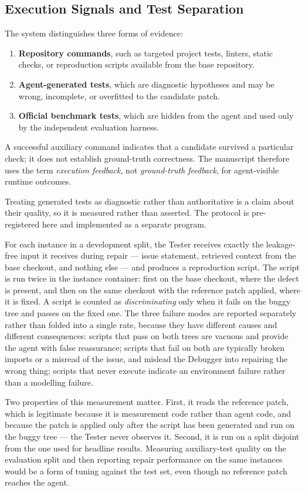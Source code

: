 \documentclass[journal]{IEEEtran}
\begin{document}
\subsection{Execution Signals and Test Separation}

The system distinguishes three forms of evidence:
\begin{enumerate}
    \item \textbf{Repository commands}, such as targeted project tests, linters, static checks, or reproduction scripts available from the base repository.
    \item \textbf{Agent-generated tests}, which are diagnostic hypotheses and may be wrong, incomplete, or overfitted to the candidate patch.
    \item \textbf{Official benchmark tests}, which are hidden from the agent and used only by the independent evaluation harness.
\end{enumerate}
A successful auxiliary command indicates that a candidate survived a particular check; it does not establish ground-truth correctness. The manuscript therefore uses the term \emph{execution feedback}, not \emph{ground-truth feedback}, for agent-visible runtime outcomes.

Treating generated tests as diagnostic rather than authoritative is a claim about their quality, so it is measured rather than asserted. The protocol is pre-registered here and implemented as a separate program.

For each instance in a development split, the Tester receives exactly the leakage-free input it receives during repair --- issue statement, retrieved context from the base checkout, and nothing else --- and produces a reproduction script. The script is run twice in the instance container: first on the base checkout, where the defect is present, and then on the same checkout with the reference patch applied, where it is fixed. A script is counted as \emph{discriminating} only when it fails on the buggy tree and passes on the fixed one. The three failure modes are reported separately rather than folded into a single rate, because they have different causes and different consequences: scripts that pass on both trees are vacuous and provide the agent with false reassurance; scripts that fail on both are typically broken imports or a misread of the issue, and mislead the Debugger into repairing the wrong thing; scripts that never execute indicate an environment failure rather than a modelling failure.

Two properties of this measurement matter. First, it reads the reference patch, which is legitimate because it is measurement code rather than agent code, and because the patch is applied only after the script has been generated and run on the buggy tree --- the Tester never observes it. Second, it is run on a split disjoint from the one used for headline results. Measuring auxiliary-test quality on the evaluation split and then reporting repair performance on the same instances would be a form of tuning against the test set, even though no reference patch reaches the agent.
\end{document}
